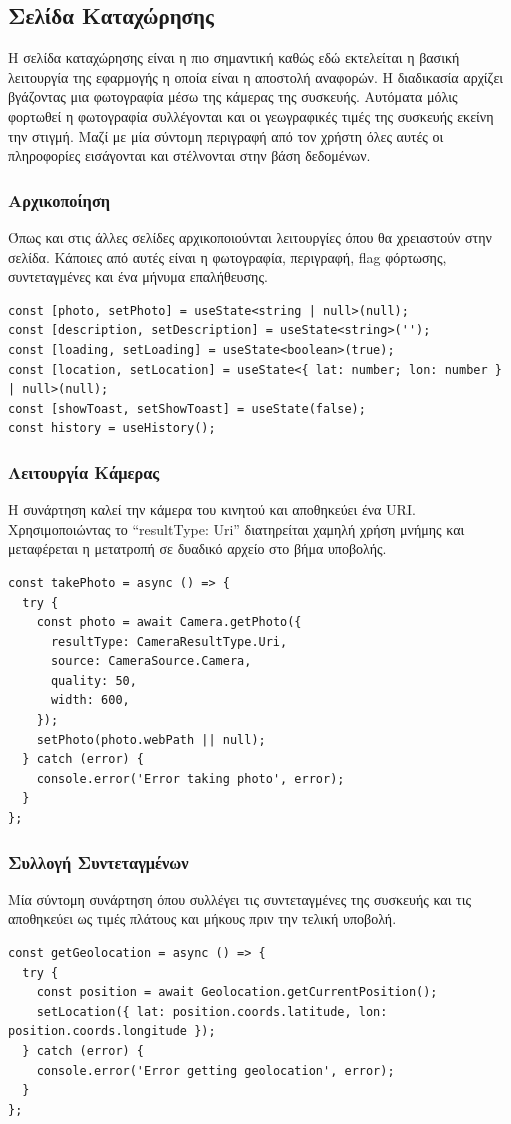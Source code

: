 \subsection{Σελίδα Καταχώρησης}
Η σελίδα καταχώρησης είναι η πιο σημαντική καθώς εδώ εκτελείται η βασική λειτουργία της εφαρμογής η οποία είναι η αποστολή αναφορών. Η διαδικασία αρχίζει βγάζοντας μια φωτογραφία μέσω της κάμερας της συσκευής. Αυτόματα μόλις φορτωθεί η φωτογραφία συλλέγονται και οι γεωγραφικές τιμές της συσκευής εκείνη την στιγμή. Μαζί με μία σύντομη περιγραφή από τον χρήστη όλες αυτές οι πληροφορίες εισάγονται και στέλνονται στην βάση δεδομένων. 

\subsubsection*{Αρχικοποίηση}
Όπως και στις άλλες σελίδες αρχικοποιούνται λειτουργίες όπου θα χρειαστούν στην σελίδα. Κάποιες από αυτές είναι η φωτογραφία, περιγραφή, flag φόρτωσης, συντεταγμένες και ένα μήνυμα επαλήθευσης.
\\
\begin{lstlisting}
const [photo, setPhoto] = useState<string | null>(null);
const [description, setDescription] = useState<string>('');
const [loading, setLoading] = useState<boolean>(true);
const [location, setLocation] = useState<{ lat: number; lon: number } | null>(null);
const [showToast, setShowToast] = useState(false);
const history = useHistory();
\end{lstlisting}

\subsubsection*{Λειτουργία Κάμερας}
Η συνάρτηση καλεί την κάμερα του κινητού και αποθηκεύει ένα URI. Χρησιμοποιώντας το “resultType: Uri” διατηρείται χαμηλή χρήση μνήμης και μεταφέρεται η μετατροπή σε δυαδικό αρχείο στο βήμα υποβολής.
\\
\begin{lstlisting}
const takePhoto = async () => {
  try {
    const photo = await Camera.getPhoto({
      resultType: CameraResultType.Uri,
      source: CameraSource.Camera,
      quality: 50,
      width: 600,
    });
    setPhoto(photo.webPath || null);
  } catch (error) {
    console.error('Error taking photo', error);
  }
};
\end{lstlisting}

\subsubsection*{Συλλογή Συντεταγμένων}
Μία σύντομη συνάρτηση όπου συλλέγει τις συντεταγμένες της συσκευής και τις αποθηκεύει ως τιμές πλάτους και μήκους πριν την τελική υποβολή.
\\
\begin{lstlisting}
const getGeolocation = async () => {
  try {
    const position = await Geolocation.getCurrentPosition();
    setLocation({ lat: position.coords.latitude, lon: position.coords.longitude });
  } catch (error) {
    console.error('Error getting geolocation', error);
  }
};
\end{lstlisting}

